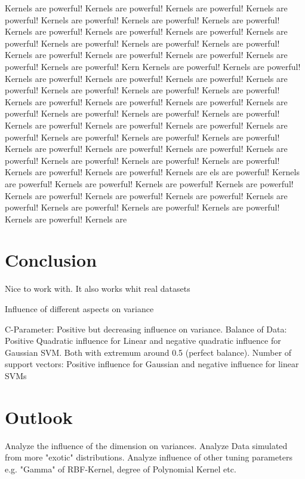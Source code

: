 \documentclass[a4paper]{article}
\begin{document}
 Kernels are powerful! Kernels are powerful! Kernels are powerful! Kernels are powerful! Kernels are powerful! Kernels are powerful! Kernels are powerful! Kernels are powerful! Kernels are powerful! Kernels are powerful! Kernels are powerful! Kernels are powerful! Kernels are powerful! Kernels are powerful! Kernels are powerful! Kernels are powerful! Kernels are powerful! Kernels are powerful! Kernels are powerful! Kern Kernels are powerful! Kernels are powerful! Kernels are powerful! Kernels are powerful! Kernels are powerful! Kernels are powerful! Kernels are powerful! Kernels are powerful! Kernels are powerful! Kernels are powerful! Kernels are powerful! Kernels are powerful! Kernels are powerful! Kernels are powerful! Kernels are powerful! Kernels are powerful! Kernels are powerful! Kernels are powerful! Kernels are powerful! Kernels are powerful! Kernels are powerful! Kernels are powerful! Kernels are powerful! Kernels are powerful! Kernels are powerful! Kernels are powerful! Kernels are powerful! Kernels are powerful! Kernels are powerful! Kernels are powerful! Kernels are powerful! Kernels are powerful! Kernels are 
els are powerful! Kernels are powerful! Kernels are powerful! Kernels are powerful! Kernels are powerful! Kernels are powerful! Kernels are powerful! Kernels are powerful! Kernels are powerful! Kernels are powerful! Kernels are powerful! Kernels are powerful! Kernels are powerful! Kernels are 


\section{Conclusion}
Nice to work with. It also works whit real datasets

Influence of different aspects on variance


C-Parameter: Positive but decreasing influence on variance. Balance of Data: Positive Quadratic influence for Linear and negative quadratic influence for Gaussian SVM. Both with extremum around 0.5 (perfect balance).
Number of support vectors: Positive influence for Gaussian and negative influence for linear SVMs

\section{Outlook}


Analyze the influence of the dimension on variances. Analyze Data simulated from more "exotic" distributions. Analyze influence of other tuning parameters e.g. "Gamma" of RBF-Kernel, degree of Polynomial Kernel etc.




\footnotesize


\end{document}
